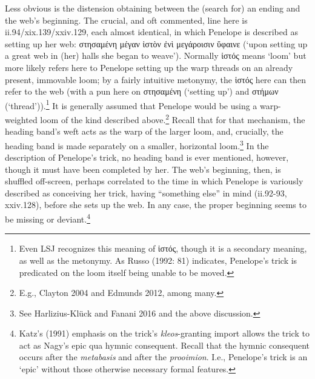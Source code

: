 \documentclass[12pt]{article}
\begin{document}
Less obvious is the distension obtaining between the (search for) an ending and the web's beginning. The crucial, and oft commented, line here is ii.94/xix.139/xxiv.129, each almost identical, in which Penelope is described as setting up her web: στησαμένη μέγαν ἱστὸν ἐνὶ μεγάροισιν ὕφαινε (`upon setting up a great web in (her) halls she began to weave'). Normally ἱστός means `loom' but more likely refers here to Penelope setting up the warp threads on an already present, immovable loom; by a fairly intuitive metonymy, the ἱστός here can then refer to the web (with a pun here on στησαμένη (`setting up') and στήμων (`thread')).\footnote{ Even LSJ recognizes this meaning of ἱστός, though it is a secondary meaning, as well as the metonymy. As Russo (1992: 81) indicates, Penelope's trick is predicated on the loom itself being unable to be moved.} It is generally assumed that Penelope would be using a warp-weighted loom of the kind described above.\footnote{ E.g., Clayton 2004 and Edmunds 2012, among many.} Recall that for that mechanism, the heading band's weft acts as the warp of the larger loom, and, crucially, the heading band is made separately on a smaller, horizontal loom.\footnote{ See Harlizius-Kl\"{u}ck and Fanani 2016 and the above discussion.} In the description of Penelope's trick, no heading band is ever mentioned, however, though it must have been completed by her. The web's beginning, then, is shuffled off-screen, perhaps correlated to the time in which Penelope is variously described as conceiving her trick, having ``something else'' in mind (ii.92-93, xxiv.128), before she sets up the web. In any case, the proper beginning seems to be missing or deviant.\footnote{  Katz's (1991) emphasis on the trick's \textit{kleos}-granting import allows the trick to act as Nagy's epic qua hymnic consequent. Recall that the hymnic consequent occurs after the \textit{metabasis} and after the \textit{prooimion}. I.e., Penelope's trick is an `epic' without those otherwise necessary formal features.}
\end{document}
